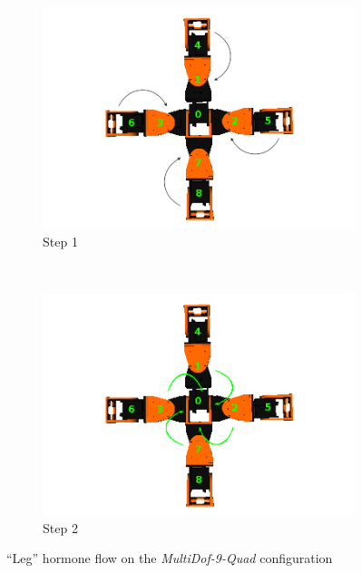 \begin{figure}[h]
		\centering
        \begin{subfigure}[l]{0.45\textwidth}
                \centering
                \includegraphics[width=\textwidth]{images/Hormone_protocol_quad_step1.png}
                \caption{Step 1}
                \label{fig:quad_step1}
        \end{subfigure}
        ~
        \begin{subfigure}[r]{0.45\textwidth}
                \centering
                \includegraphics[width=\textwidth]{images/Hormone_protocol_quad_step2.png}
                \caption{Step 2}
                \label{fig:quad_step2}
        \end{subfigure}
        \caption{``Leg'' hormone flow on the \emph{MultiDof-9-Quad} configuration}\label{fig:global_conf_discovery_quad}
\end{figure}

